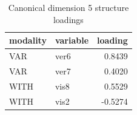 \begin{table}
\caption{Canonical dimension 5 structure loadings}
\label{tab:cca_dimension_5_loadings}
\begin{tabular}{llr}
\toprule
modality & variable & loading \\
\midrule
VAR & ver6 & 0.8439 \\
VAR & ver7 & 0.4020 \\
WITH & vis8 & 0.5529 \\
WITH & vis2 & -0.5274 \\
\bottomrule
\end{tabular}
\end{table}
